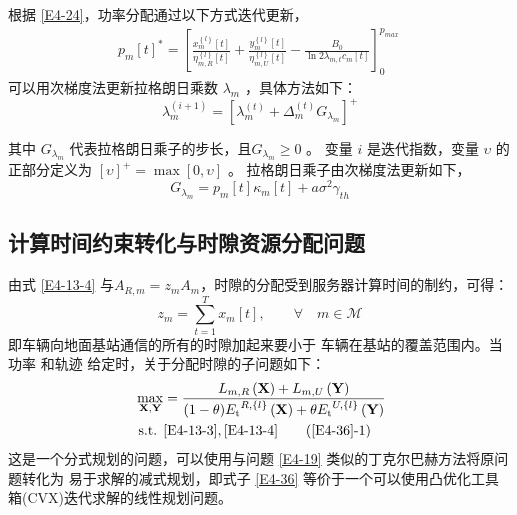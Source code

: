 根据 \eqref{E4-24}，功率分配通过以下方式迭代更新，
\begin{align} \label{E4-26}
{{p}_{m}}{{\left[ t \right]}^{*}}=\left[ \frac{x_{m}^{\left\{ l \right\}}\left[ t \right]}{\eta _{m,R}^{\left\{ l \right\}}\left[ t \right]}+\frac{y_{m}^{\left\{ l \right\}}\left[ t \right]}{\eta _{m,U}^{\left\{ l \right\}}\left[ t \right]}-\frac{{{B}_{0}}}{\ln 2{{\lambda }_{m,t}}{{c}_{m}}\left[ t \right]} \right]_{0}^{{{p}_{max}}\ }
\end{align}
可以用次梯度法更新拉格朗日乘数 $\lambda_m$ ，具体方法如下：
\begin{equation}\label{E4-27}
\lambda _{m}^{\left( i+1 \right)}={{\left[ \lambda _{m}^{\left( t \right)}+\Delta _{m}^{\left( t \right)}{{G}_{{{\lambda}_{m}}}} \right]}^{+}}
\end{equation}

其中 ${{G}_{{{\lambda}_{m}}}}$ 代表拉格朗日乘子的步长，且${{G}_{{{\lambda}_{m}}}}\geq0$ 。
变量 $i$ 是迭代指数，变量 $\upsilon$ 的正部分定义为 $\left[\upsilon \right]^+=\max{\left[0,\upsilon \right]} $ 。
拉格朗日乘子由次梯度法更新如下，
\begin{equation}\label{E4-28}
{{G}_{{{\lambda }_{m}}}}={{p}_{m}}\left[ t \right]{{\kappa }_{m}}\left[ t \right]+a{{\sigma }^{2}}{{\gamma }_{th}}
\end{equation} %
\subsection{计算时间约束转化与时隙资源分配问题}\label{section4-3-3}
由式 \eqref{E4-13-4} 与$A_{R,m}={{z}_{m}}A_m$，时隙的分配受到服务器计算时间的制约，可得：
\begin{equation} \label{E4-35}
{{z}_{m}}=\underset{t=1}{\overset{T}{\mathop{\sum }}}{{x}_{m}}\left[ t \right]   ,\qquad\forall \!\!\!\!\!\! \quad m \in \mathcal{M}
\end{equation}
即车辆向地面基站通信的所有的时隙加起来要小于
车辆在基站的覆盖范围内。当功率 和轨迹 {}给定时，关于分配时隙的子问题如下：
\begin{align} \label{E4-36}
\max _{ \mathbf{X},\mathbf{Y}}  &  ={\frac{{{L}_{m,R}\left( \mathbf{X} \right)+{{L}_{m,U}}\left( \mathbf{Y} \right)}}
{(1-\theta){{E}_{\text{t}}}^{R,\left\{ l \right\}}\left( \mathbf{X} \right)+\theta{{E}_{\text{t}}}^{U,\left\{ l \right\}}\left( \mathbf{Y} \right)}}     \\
\text { s.t. }
& \eqref{E4-13-3},\eqref{E4-13-4}                                                        \tag{\ref{E4-36}{-1}}           \label{E4-36-1}
\end{align}
这是一个分式规划的问题，可以使用与问题 \eqref{E4-19} 类似的丁克尔巴赫方法将原问题转化为
易于求解的减式规划，即式子 \eqref{E4-36} 等价于一个可以使用凸优化工具箱(CVX)迭代求解的线性规划问题。
